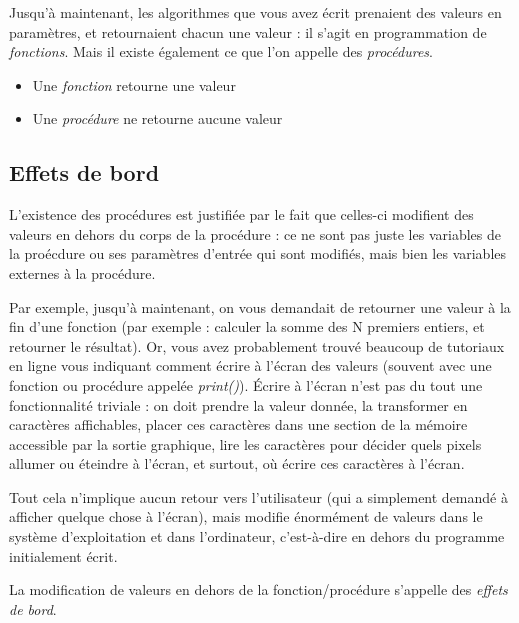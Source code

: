 \documentclass[11pt,a4paper]{article}
\begin{document}
Jusqu'à maintenant, les algorithmes que vous avez écrit prenaient des valeurs en paramètres, et retournaient chacun une valeur : il s'agit en programmation de \textit{fonctions}.
Mais il existe également ce que l'on appelle des \textit{procédures}.

\bigskip

\begin{itemize}
\item Une \textit{fonction} retourne une valeur
\item Une \textit{procédure} ne retourne aucune valeur
\end{itemize}

\bigskip

\subsection{Effets de bord}

L'existence des procédures est justifiée par le fait que celles-ci modifient des valeurs en dehors du corps de la procédure : ce ne sont pas juste les variables de la proécdure ou ses paramètres d'entrée qui sont modifiés, mais bien les variables externes à la procédure.

\medskip

Par exemple, jusqu'à maintenant, on vous demandait de retourner une valeur à la fin d'une fonction (par exemple : calculer la somme des N premiers entiers, et retourner le résultat).
Or, vous avez probablement trouvé beaucoup de tutoriaux en ligne vous indiquant comment écrire à l'écran des valeurs (souvent avec une fonction ou procédure appelée \textit{print()}).
\'Ecrire à l'écran n'est pas du tout une fonctionnalité triviale : on doit prendre la valeur donnée, la transformer en caractères affichables, placer ces caractères dans une section de la mémoire accessible par la sortie graphique, lire les caractères pour décider quels pixels allumer ou éteindre à l'écran, et surtout, où écrire ces caractères à l'écran.

\medskip

Tout cela n'implique aucun retour vers l'utilisateur (qui a simplement demandé à afficher quelque chose à l'écran), mais modifie énormément de valeurs dans le système d'exploitation et dans l'ordinateur, c'est-à-dire en dehors du programme initialement écrit.

\bigskip

La modification de valeurs en dehors de la fonction/procédure s'appelle des \textit{effets de bord}.
\end{document}
